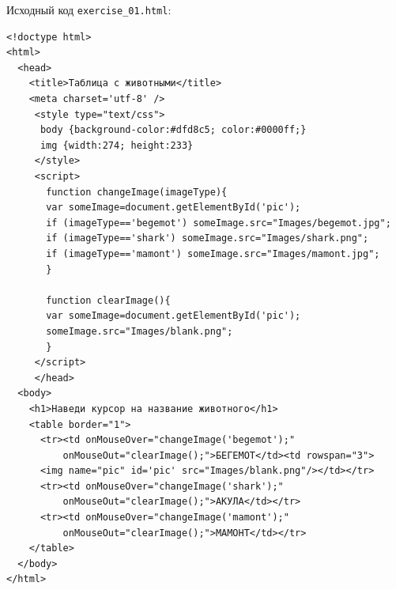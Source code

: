 Исходный код \verb|exercise_01.html|:

\begin{verbatim}
<!doctype html>
<html>
  <head>
    <title>Таблица с животными</title>
    <meta charset='utf-8' />
     <style type="text/css">
      body {background-color:#dfd8c5; color:#0000ff;}
      img {width:274; height:233}
     </style>
     <script>
       function changeImage(imageType){
	   var someImage=document.getElementById('pic');	   
	   if (imageType=='begemot') someImage.src="Images/begemot.jpg";
	   if (imageType=='shark') someImage.src="Images/shark.png";
	   if (imageType=='mamont') someImage.src="Images/mamont.jpg";
       }

       function clearImage(){
	   var someImage=document.getElementById('pic');
	   someImage.src="Images/blank.png";
       }
     </script>
     </head>
  <body>
    <h1>Наведи курсор на название животного</h1>
    <table border="1">
      <tr><td onMouseOver="changeImage('begemot');"
	      onMouseOut="clearImage();">БЕГЕМОТ</td><td rowspan="3">
	  <img name="pic" id='pic' src="Images/blank.png"/></td></tr>
      <tr><td onMouseOver="changeImage('shark');"
	      onMouseOut="clearImage();">АКУЛА</td></tr>
      <tr><td onMouseOver="changeImage('mamont');"
	      onMouseOut="clearImage();">МАМОНТ</td></tr>
    </table>
  </body>
</html>
\end{verbatim}
